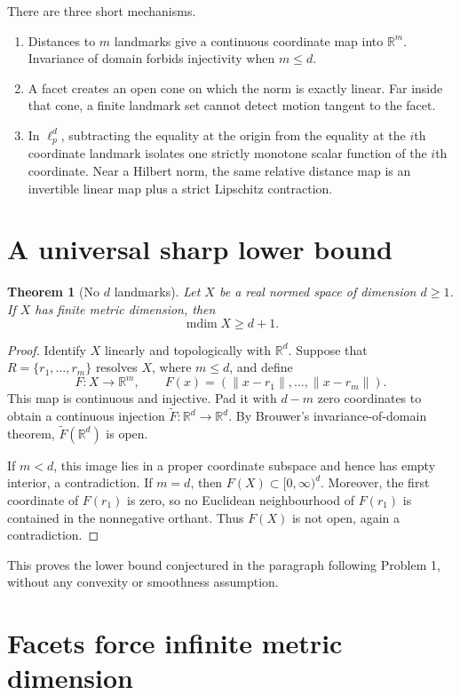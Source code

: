 \documentclass[11pt]{amsart}
\newtheorem{theorem}{Theorem}
\theoremstyle{remark}
\newcommand{\R}{\mathbb R}
\newcommand{\mdim}{\operatorname{mdim}}
\begin{document}
There are three short mechanisms.
\begin{enumerate}
\item Distances to $m$ landmarks give a continuous coordinate map into
$\R^m$.  Invariance of domain forbids injectivity when $m\le d$.
\item A facet creates an open cone on which the norm is exactly linear.  Far
inside that cone, a finite landmark set cannot detect motion tangent to the
facet.
\item In $\ell_p^d$, subtracting the equality at the origin from the equality
at the $i$th coordinate landmark isolates one strictly monotone scalar
function of the $i$th coordinate.  Near a Hilbert norm, the same relative
distance map is an invertible linear map plus a strict Lipschitz contraction.
\end{enumerate}

\section{A universal sharp lower bound}

\begin{theorem}[No $d$ landmarks]\label{thm:lower}
Let $X$ be a real normed space of dimension $d\ge1$.  If $X$ has finite metric
dimension, then
\[
 \mdim X\ge d+1.
\]
\end{theorem}

\begin{proof}
Identify $X$ linearly and topologically with $\R^d$.  Suppose that
$R=\{r_1,\dots,r_m\}$ resolves $X$, where $m\le d$, and define
\[
 F:X\longrightarrow\R^m,\qquad
 F(x)=(\|x-r_1\|,\dots,\|x-r_m\|).
\]
This map is continuous and injective.  Pad it with $d-m$ zero coordinates to
obtain a continuous injection $\widetilde F:\R^d\to\R^d$.  By Brouwer's
invariance-of-domain theorem, $\widetilde F(\R^d)$ is open.

If $m<d$, this image lies in a proper coordinate subspace and hence has empty
interior, a contradiction.  If $m=d$, then
$F(X)\subset[0,\infty)^d$.  Moreover, the first coordinate of $F(r_1)$ is
zero, so no Euclidean neighbourhood of $F(r_1)$ is contained in the
nonnegative orthant.  Thus $F(X)$ is not open, again a contradiction.
\end{proof}

This proves the lower bound conjectured in the paragraph following Problem 1,
without any convexity or smoothness assumption.

\section{Facets force infinite metric dimension}
\end{document}
